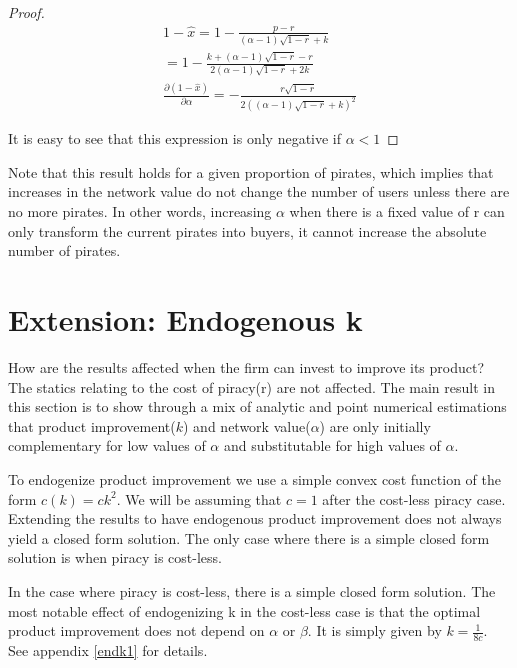 \documentclass[11pt]{article}
\begin{document}
\begin{proof}
\begin{align*}
1 - \hat{x}= 1 - \frac{p-r}{(\alpha - 1) \sqrt{1-r} +k} \\
= 1 - \frac{k+ (\alpha-1)\sqrt{ 1 -r }-r}{2(\alpha - 1) \sqrt{1-r} +2k} \\
\frac{\partial (1 - \hat{x})}{\partial \alpha}
=-\frac{ r\sqrt{1-r} }{2 \left((\alpha-1) \sqrt{1-r}+k\right)^2}
\end{align*}

It is easy to see that this expression is only negative if $\alpha<1$

\end{proof}

Note that this result holds for a given proportion of pirates, which implies that increases in the network value do not change the number of users unless there are no more pirates. In other words, increasing $\alpha$ when there is a fixed value of r can only transform the current pirates into buyers, it cannot increase the absolute number of pirates. 



\section{Extension: Endogenous k}


How are the results affected when the firm can invest to improve its product? The statics relating to the cost of piracy(r) are not affected. The main result in this section is to show through a mix of analytic and point numerical estimations that product improvement($k$) and network value($\alpha$) are only initially complementary for low values of $\alpha$ and substitutable for high values of $\alpha$.

To endogenize product improvement we use a simple convex cost function of the form $c(k)=ck^2$. We will be assuming that $c=1$ after the cost-less piracy case. Extending the results to have endogenous product improvement does not always yield a closed form solution. The only case where there is a simple closed form solution is when piracy is cost-less. 

In the case where piracy is cost-less, there is a simple closed form solution. The most notable effect of endogenizing k in the cost-less case is that the optimal product improvement does not depend on $\alpha$ or $\beta$. It is simply given by $k=\frac{1}{8c}$. See appendix \ref{endk1} for details.
\end{document}
